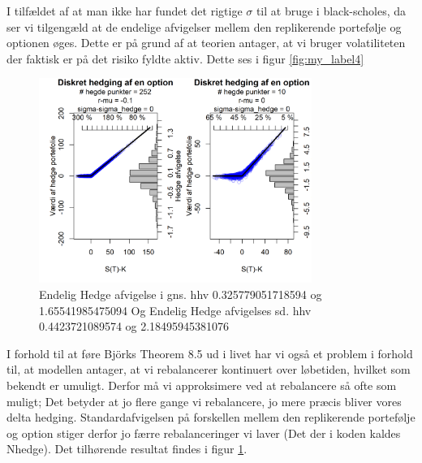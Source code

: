 \documentclass{article}
\theoremstyle{definition}
\theoremstyle{remark}
\begin{document}
I tilfældet af at man ikke har fundet det rigtige $\sigma$ til at bruge i black-scholes, da ser vi tilgengæld at de endelige afvigelser mellem den replikerende portefølje og optionen øges. Dette er på grund af at teorien antager, at vi bruger volatiliteten der faktisk er på det risiko fyldte aktiv. Dette ses i figur \ref{fig:my_label4}
\begin{figure}
    \centering
    \includegraphics[width=3.5in]{Overleaf/1 opttype_mu_Nhedge.png}
    \caption{Endelig Hedge afvigelse i gns. hhv 0.325779051718594 og 1.65541985475094 Og Endelig Hedge afvigelses sd. hhv 0.4423721089574 og 2.18495945381076}
    \label{fig:my_label5}
\end{figure}

I forhold til at føre Björks Theorem 8.5 \cite{Bjork2020} ud i livet har vi også et problem i forhold til, at modellen antager, at vi rebalancerer kontinuert over løbetiden, hvilket som bekendt er umuligt. Derfor må vi approksimere ved at rebalancere så ofte som muligt; Det betyder at jo flere gange vi rebalancere, jo mere præcis bliver vores delta hedging. Standardafvigelsen på forskellen mellem den replikerende portefølje og option stiger derfor jo færre rebalanceringer vi laver (Det der i koden kaldes Nhedge). Det tilhørende resultat findes i figur \ref{fig:my_label5}.
\end{document}
